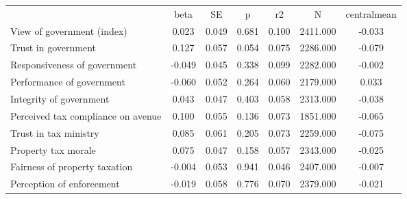 {\def\sym#1{\ifmmode^{#1}\else\(^{#1}\)\fi} \begin{tabular}{l*{6}{c}} \hline\hline 
& beta & SE & p & r2 & N & centralmean \\
View of government (index) & 0.023 & 0.049 & 0.681 & 0.100 & 2411.000 & -0.033 \\
Trust in government & 0.127 & 0.057 & 0.054 & 0.075 & 2286.000 & -0.079 \\
Responsiveness of government & -0.049 & 0.045 & 0.338 & 0.099 & 2282.000 & -0.002 \\
Performance of government & -0.060 & 0.052 & 0.264 & 0.060 & 2179.000 & 0.033 \\
Integrity of government & 0.043 & 0.047 & 0.403 & 0.058 & 2313.000 & -0.038 \\
Perceived tax compliance on avenue & 0.100 & 0.055 & 0.136 & 0.073 & 1851.000 & -0.065 \\
Trust in tax ministry & 0.085 & 0.061 & 0.205 & 0.073 & 2259.000 & -0.075 \\
Property tax morale & 0.075 & 0.047 & 0.158 & 0.057 & 2343.000 & -0.025 \\
Fairness of property taxation & -0.004 & 0.053 & 0.941 & 0.046 & 2407.000 & -0.007 \\
Perception of enforcement & -0.019 & 0.058 & 0.776 & 0.070 & 2379.000 & -0.021 \\
\hline\hline \end{tabular} }
